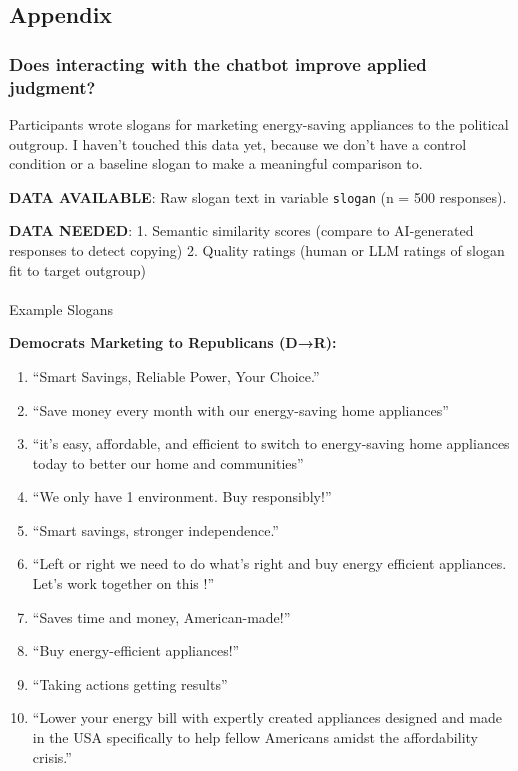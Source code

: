 \documentclass[
  11pt,
  oneside]{article}
\makeatletter
\let\oldparagraph\paragraph
\renewcommand{\paragraph}{
    \@ifstar
      \xxxParagraphStar
      \xxxParagraphNoStar
  }
\newcommand{\xxxParagraphStar}[1]{\oldparagraph*{#1}\mbox{}}
\newcommand{\xxxParagraphNoStar}[1]{\oldparagraph{#1}\mbox{}}
\providecommand{\tightlist}{%
  \setlength{\itemsep}{0pt}\setlength{\parskip}{0pt}}\usepackage{longtable,booktabs,array}
\makeatother
\begin{document}
\subsection{Appendix}\label{appendix}

\subsubsection{Does interacting with the chatbot improve applied
judgment?}\label{does-interacting-with-the-chatbot-improve-applied-judgment}

Participants wrote slogans for marketing energy-saving appliances to the
political outgroup. I haven't touched this data yet, because we don't
have a control condition or a baseline slogan to make a meaningful
comparison to.

\textbf{DATA AVAILABLE}: Raw slogan text in variable \texttt{slogan} (n
= 500 responses).

\textbf{DATA NEEDED}: 1. Semantic similarity scores (compare to
AI-generated responses to detect copying) 2. Quality ratings (human or
LLM ratings of slogan fit to target outgroup)

\paragraph{Example Slogans}\label{example-slogans}

\textbf{Democrats Marketing to Republicans (D→R):}

\begin{enumerate}
\def\labelenumi{\arabic{enumi}.}
\tightlist
\item
  ``Smart Savings, Reliable Power, Your Choice.''
\item
  ``Save money every month with our energy-saving home appliances''
\item
  ``it's easy, affordable, and efficient to switch to energy-saving home
  appliances today to better our home and communities''
\item
  ``We only have 1 environment. Buy responsibly!''
\item
  ``Smart savings, stronger independence.''
\item
  ``Left or right we need to do what's right and buy energy efficient
  appliances. Let's work together on this !''
\item
  ``Saves time and money, American-made!''
\item
  ``Buy energy-efficient appliances!''
\item
  ``Taking actions getting results''
\item
  ``Lower your energy bill with expertly created appliances designed and
  made in the USA specifically to help fellow Americans amidst the
  affordability crisis.''
\end{enumerate}
\end{document}
